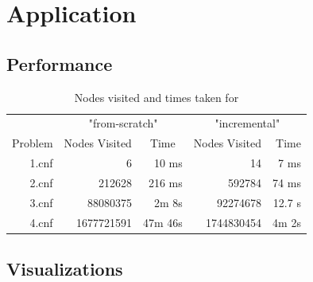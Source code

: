 \documentclass[10pt]{article}
\begin{document}
\section{Application}

\subsection{Performance}
\label{sec:scratch-vs-incremental}
\begin{table}[H] \centering
\begin{tabular}{r | *2{r r} }
\hline\hline
        & \multicolumn{2}{c|}{"from-scratch"} & \multicolumn{2}{c}{"incremental"} \\
Problem & Nodes Visited & \multicolumn{1}{c|}{Time} & Nodes Visited & Time \\
\hline
1.cnf & 6          &   10 ms &         14 & 7 ms \\
2.cnf & 212628     &  216 ms &     592784 & 74 ms \\
3.cnf & 88080375   &   2m 8s &   92274678 & 12.7 s\\
4.cnf & 1677721591 & 47m 46s & 1744830454 & 4m 2s\\
\hline
\end{tabular}
\caption{Nodes visited and times taken for }
\end{table}

\subsection{Visualizations}
\begin{figure}[H]
\centering
{}
\end{figure}
\end{document}
